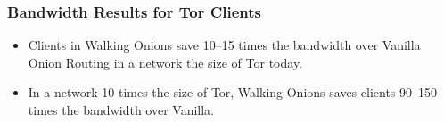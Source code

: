 \documentclass[hyperref={pdfpagelabels=true},table,dvipsnames,14pt,aspectratio=169]{beamer}
\begin{document}
\begin{frame}
\frametitle{Bandwidth Results for Tor Clients}

\begin{center}
  \hspace{-1.7cm}
  \begin{minipage}[t] {0.45\linewidth}
    \vspace*{8em}
  \end{minipage}
  \hspace{0.5cm}
  \begin{minipage}[t] {0.45\linewidth}
    \vspace*{8em}
  \end{minipage}
\end{center}

  \small
  \begin{itemize}
    \item<2->  Clients in Walking Onions save 10--15 times the
    bandwidth
    over
      Vanilla Onion Routing in a network the size of Tor today.
    \item<3->  In a network 10 times the size of Tor, Walking Onions
    saves
      clients 90--150 times the bandwidth over Vanilla.
  \end{itemize}
\end{frame}
\end{document}
